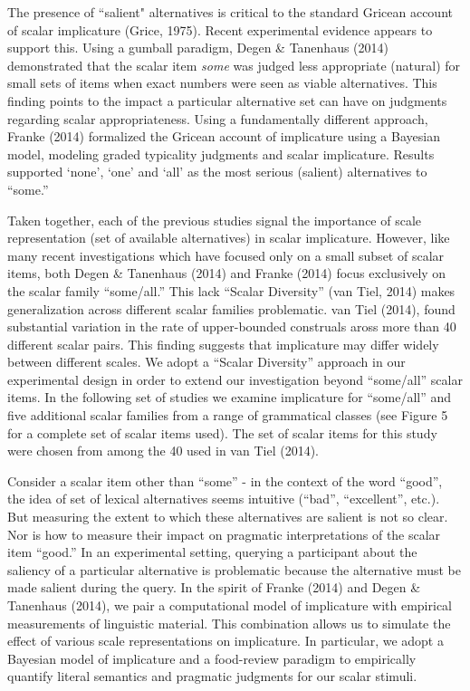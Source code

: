 \documentclass[10pt, letterpaper]{article}
\begin{document}
The presence of ``salient" alternatives is critical to the standard
Gricean account of scalar implicature (Grice, 1975). Recent experimental
evidence appears to support this. Using a gumball paradigm, Degen \&
Tanenhaus (2014) demonstrated that the scalar item \emph{some} was
judged less appropriate (natural) for small sets of items when exact
numbers were seen as viable alternatives. This finding points to the
impact a particular alternative set can have on judgments regarding
scalar appropriateness. Using a fundamentally different approach, Franke
(2014) formalized the Gricean account of implicature using a Bayesian
model, modeling graded typicality judgments and scalar implicature.
Results supported `none', `one' and `all' as the most serious (salient)
alternatives to ``some.''

Taken together, each of the previous studies signal the importance of
scale representation (set of available alternatives) in scalar
implicature. However, like many recent investigations which have focused
only on a small subset of scalar items, both Degen \& Tanenhaus (2014)
and Franke (2014) focus exclusively on the scalar family ``some/all.''
This lack ``Scalar Diversity'' (van Tiel, 2014) makes generalization
across different scalar families problematic. van Tiel (2014), found
substantial variation in the rate of upper-bounded construals aross more
than 40 different scalar pairs. This finding suggests that implicature
may differ widely between different scales. We adopt a ``Scalar
Diversity'' approach in our experimental design in order to extend our
investigation beyond ``some/all'' scalar items. In the following set of
studies we examine implicature for ``some/all'' and five additional
scalar families from a range of grammatical classes (see Figure 5 for a
complete set of scalar items used). The set of scalar items for this
study were chosen from among the 40 used in van Tiel (2014).

Consider a scalar item other than ``some'' - in the context of the word
``good'', the idea of set of lexical alternatives seems intuitive
(``bad'', ``excellent'', etc.). But measuring the extent to which these
alternatives are salient is not so clear. Nor is how to measure their
impact on pragmatic interpretations of the scalar item ``good.'' In an
experimental setting, querying a participant about the saliency of a
particular alternative is problematic because the alternative must be
made salient during the query. In the spirit of Franke (2014) and Degen
\& Tanenhaus (2014), we pair a computational model of implicature with
empirical measurements of linguistic material. This combination allows
us to simulate the effect of various scale representations on
implicature. In particular, we adopt a Bayesian model of implicature and
a food-review paradigm to empirically quantify literal semantics and
pragmatic judgments for our scalar stimuli.
\end{document}
